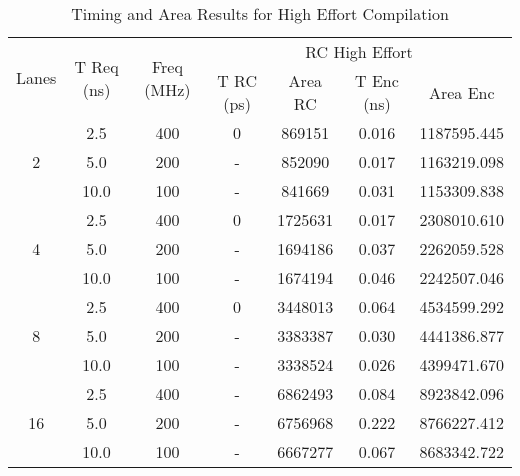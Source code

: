 \documentclass[conference]{IEEEtran}
\begin{document}
\begin{table}[!t]
	\renewcommand{\arraystretch}{1.3}
	\caption{Timing and Area Results for High Effort Compilation}
	\label{table_example}
	\centering
	\begin{tabular}{|c|c|c|c|c|c|c|}
		\hline
		\multirow{3}{*}{Lanes} & \multirow{3}{0.8cm}{T Req (ns)} &\multirow{3}{0.7cm}{Freq (MHz)} & \multicolumn{4}{|c|}{RC High Effort}\\  \cline{4-7}
		&&&\multirow{2}{0.7cm}{T RC (ps)} & \multirow{2}{0.8cm}{Area RC} & \multirow{2}{0.8cm}{T Enc (ns)} & \multirow{2}{0.8cm}{Area Enc}\\
		&&&&&&\\
		\hline
		\multirow{3}{*}{2}&2.5&400&0&869151&0.016&1187595.445\\
		\cline{2-7}
		&5.0&200&-&852090&0.017&1163219.098\\
		\cline{2-7}
		&10.0&100&-&841669&0.031&1153309.838\\
		\hline
		\multirow{3}{*}{4}&2.5&400&0&1725631&0.017&2308010.610\\
		\cline{2-7}
		&5.0&200&-&1694186&0.037&2262059.528\\
		\cline{2-7}
		&10.0&100&-&1674194&0.046&2242507.046\\
		\hline
		\multirow{3}{*}{8}&2.5&400&0&3448013&0.064&4534599.292\\
		\cline{2-7}
		&5.0&200&-&3383387&0.030&4441386.877\\
		\cline{2-7}
		&10.0&100&-&3338524&0.026&4399471.670\\
		\hline
		\multirow{3}{*}{16}&2.5&400&-&6862493&0.084&8923842.096\\
		\cline{2-7}
		&5.0&200&-&6756968&0.222&8766227.412\\
		\cline{2-7}
		&10.0&100&-&6667277&0.067&8683342.722\\
		\hline
	\end{tabular}
\end{table}
\end{document}
